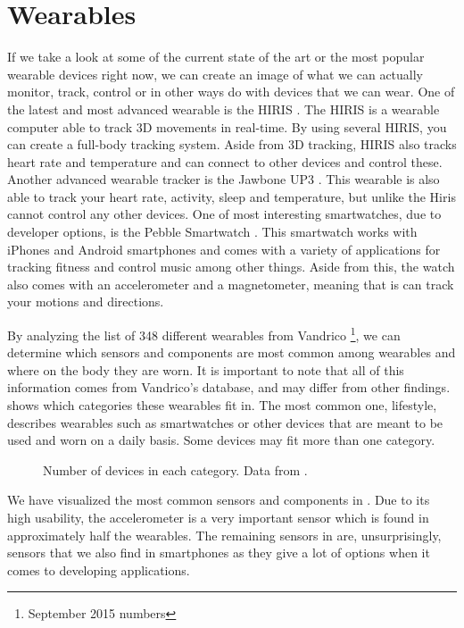 \section{Wearables}\label{sec:wearables}
If we take a look at some of the current state of the art or the most popular wearable devices right now, 
we can create an image of what we can actually monitor, track, control or in other ways do with devices that we can wear. 
One of the latest and most advanced wearable is the HIRIS \cite{hirisweb}. 
The HIRIS is a wearable computer able to track 3D movements in real-time. 
By using several HIRIS, you can create a full-body tracking system.
Aside from 3D tracking, HIRIS also tracks heart rate and temperature and can connect to other devices and control these. 
Another advanced wearable tracker is the Jawbone UP3 \cite{JAWBONE}. 
This wearable is also able to track your heart rate, activity, sleep and temperature, but unlike the Hiris cannot control any other devices. 
One of most interesting smartwatches, due to developer options, is the Pebble Smartwatch \cite{PEBBLE}. 
This smartwatch works with iPhones and Android smartphones and comes with a variety of applications for tracking fitness and control music among other things. 
Aside from this, the watch also comes with an accelerometer and a magnetometer, meaning that is can track your motions and directions. 

By analyzing the list of 348 different wearables from Vandrico \cite{LISTOFWEARABLES}\footnote{September 2015 numbers}, 
we can determine which sensors and components are most common among wearables and where on the body they are worn. 
It is important to note that all of this information comes from Vandrico's database, and may differ from other findings. 
 shows which categories these wearables fit in. 
The most common one, lifestyle, describes wearables such as smartwatches or other devices that are meant to be used and worn on a daily basis. 
Some devices may fit more than one category.

\begin{figure}[!htb]
    \centering
    
    \caption{Number of devices in each category. Data from \protect\cite{LISTOFWEARABLES}.}
    \label{fig:wearables-category}
\end{figure}

We have visualized the most common sensors and components in .
Due to its high usability, the accelerometer is a very important sensor which is found in approximately half the wearables. 
The remaining sensors in  are, unsurprisingly, sensors that we also find in smartphones as they give a lot of options when it comes to developing applications. 

